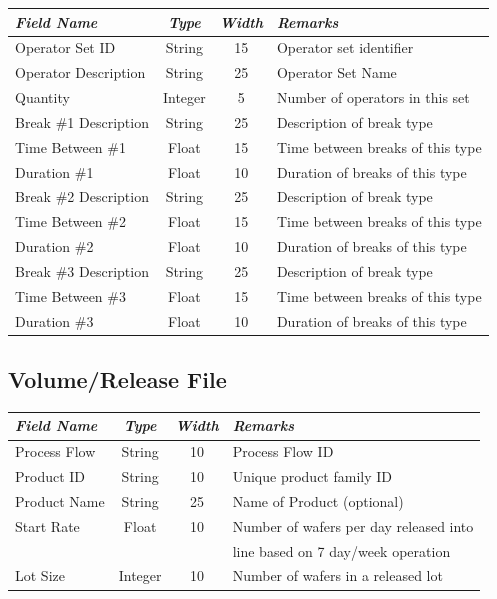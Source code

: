    \begin{center}
   \begin{tabular}{|l|c|c|l|}  \hline
   {\em Field Name} &  {\em Type} & {\em Width } & {\em Remarks} \\ \hline
   Operator Set ID & String & 15 & Operator set identifier \\
   Operator Description & String & 25 & Operator Set Name \\
   Quantity  & Integer & 5 & Number of operators in this set \\
   Break \#1 Description & String & 25 & Description of break type \\
   Time Between \#1 & Float & 15 & Time between breaks of this type \\
   Duration \#1 & Float & 10 & Duration of breaks of this type \\
   Break \#2 Description & String & 25 & Description of break type \\
   Time Between \#2 & Float & 15 & Time between breaks of this type \\
   Duration \#2 & Float & 10 & Duration of breaks of this type \\
   Break \#3 Description & String & 25 & Description of break type \\
   Time Between \#3 & Float & 15 & Time between breaks of this type \\
   Duration \#3 & Float & 10 & Duration of breaks of this type \\ \hline
   \end{tabular}
   \end{center}
   
   \subsection{Volume/Release  File}
   
   \begin{center}
   \begin{tabular}{|l|c|c|l|}  \hline
   {\em Field Name} &  {\em Type} & {\em Width } & {\em Remarks} \\ \hline
   Process Flow & String & 10 & Process Flow ID \\
   Product ID & String & 10 & Unique product family ID  \\
   Product Name & String & 25 & Name of Product (optional) \\
   Start Rate & Float & 10 & Number of wafers per day  released into \\
    & & & line based on 7 day/week operation \\
   Lot Size & Integer & 10 & Number of wafers in a released lot \\ \hline
   \end{tabular}
   \end{center}
  
